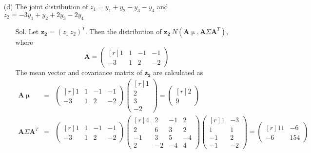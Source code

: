 \documentclass[12pt]{article} %
\begin{document}
\begin{enumerate}
\begin{enumerate}
		\item[(d)] The joint distribution of $z_{1}=y_{1}+y_{2}-y_{3}-y_{4}$ and
		$z_{2}=-3y_{1}+y_{2}+2y_{3}-2y_{4}$
			\begin{enumerate}
				\item[Sol.] Let $\mathbf{z_{2}}=(z_{1}~z_{2})^{T}$. Then the distribution of 
				$\mathbf{z_{2}}~N(\mathbf{A}\upmu, \mathbf{A}\Sigma\mathbf{A}^{T})$, 
				where
				$$
					\mathbf{A}=
					\begin{pmatrix}[r]
						1 & 1 & -1 & -1 \\
						   -3 & 1 & 2 & -2 
					\end{pmatrix}   
				$$
				The mean vector and covariance matrix of $\mathbf{z_{2}}$ are calculated as
				\begin{eqnarray*}
					\mathbf{A}\upmu&=&
					\begin{pmatrix}[r]
						1 & 1 & -1 & -1 \\
					   -3 & 1 & 2 & -2 
					\end{pmatrix}
					\begin{pmatrix}[r]
						 1\\
						 2\\
						 3\\
						-2										
					\end{pmatrix}=
					\begin{pmatrix}[r]
						2 \\
						9 
					\end{pmatrix}\\
					\mathbf{A}\Sigma\mathbf{A}^{T}&=&
					\begin{pmatrix}[r]
						1 & 1 & -1 & -1 \\
					   -3 & 1 & 2 & -2 
					\end{pmatrix}
					\begin{pmatrix}[r]
						 4& 2& -1& 2\\
						 2& 6& 3&  2\\
					    -1& 3& 5& -4\\
					     2&-2&-4& 4  						
					\end{pmatrix}
					\begin{pmatrix}[r]
					 1 & -3\\
					 1 & 1\\
				    -1 & 2\\
					-1 &-2
					\end{pmatrix}=
					\begin{pmatrix}[r]
						 11 & -6 \\
					     -6 & 154

\end{pmatrix}
\end{eqnarray*}
\end{enumerate}
\end{enumerate}
\end{enumerate}
\end{document}
